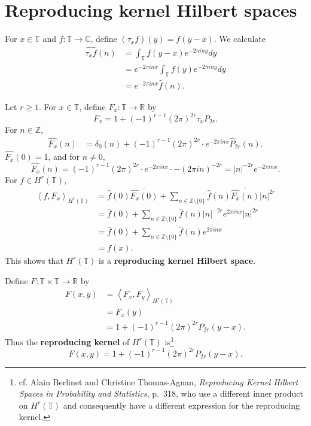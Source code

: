 \documentclass{article}
\newcommand{\inner}[2]{\left\langle #1, #2 \right\rangle}
\theoremstyle{definition}
\theoremstyle{definition}
\begin{document}
\section{Reproducing kernel Hilbert spaces}
For $x \in \mathbb{T}$ and $f:\mathbb{T} \to \mathbb{C}$, define $(\tau_x f)(y)=f(y-x)$. 
We calculate
\begin{align*}
\widehat{\tau_x f}(n)&=\int_{\mathbb{T}} f(y-x) e^{-2\pi in y} dy\\
&=e^{-2\pi inx}  \int_{\mathbb{T}} f(y) e^{-2\pi iny} dy\\
&=e^{-2\pi inx} \widehat{f}(n).
\end{align*}

Let $r \geq 1$. For $x \in \mathbb{T}$, define $F_x:\mathbb{T} \to \mathbb{R}$ by
\[
F_x = 1 + (-1)^{r-1} (2\pi)^{2r} \tau_x P_{2r}.
\] 
For $n \in \mathbb{Z}$,
\begin{align*}
\widehat{F_x}(n)&=\delta_0(n) + (-1)^{r-1} (2\pi)^{2r} \cdot e^{-2\pi inx} \widehat{P}_{2r}(n).
\end{align*}
$\widehat{F_x}(0) = 1$, and for $n \neq 0$,
\[
\widehat{F_x}(n) = (-1)^{r-1} (2\pi)^{2r} \cdot e^{-2\pi inx} \cdot -(2\pi in)^{-2r}
= |n|^{-2r} e^{-2\pi inx}.
\]
For $f \in H^r(\mathbb{T})$,
\begin{align*}
\inner{f}{F_x}_{H^r(\mathbb{T})}&=\widehat{f}(0) \overline{\widehat{F_x}(0)}
+\sum_{n \in \mathbb{Z} \setminus \{0\}} \widehat{f}(n) \overline{\widehat{F_x}(n)} |n|^{2r}\\
&=\widehat{f}(0) + \sum_{n \in \mathbb{Z} \setminus \{0\}} \widehat{f}(n) |n|^{-2r} e^{2\pi inx} |n|^{2r}\\
&=\widehat{f}(0) + \sum_{n \in \mathbb{Z} \setminus \{0\}} \widehat{f}(n) e^{2\pi inx}\\
&=f(x).
\end{align*}
This shows that $H^r(\mathbb{T})$ is a \textbf{reproducing kernel Hilbert space}.

Define $F:\mathbb{T} \times \mathbb{T} \to \mathbb{R}$ by
\begin{align*}
F(x,y)&=\inner{F_x}{F_y}_{H^r(\mathbb{T})}\\
&=F_x(y)\\
&=1+(-1)^{r-1}(2\pi)^{2r} P_{2r}(y-x).
\end{align*}
Thus the \textbf{reproducing kernel} of $H^r(\mathbb{T})$ is\footnote{cf. Alain Berlinet and Christine Thomas-Agnan, {\em Reproducing Kernel Hilbert Spaces
in Probability and Statistics}, p.~318, who use a different inner product on $H^r(\mathbb{T})$ and consequently have a different expression
for the reproducing kernel.}
\[
F(x,y)=1+(-1)^{r-1}(2\pi)^{2r} P_{2r}(y-x).
\]
\end{document}
